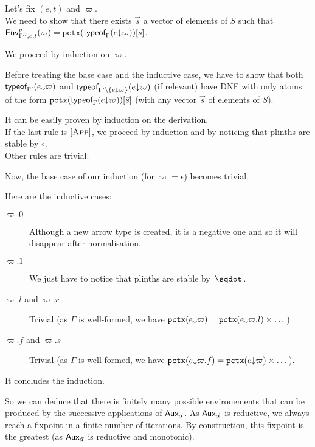 \documentclass[a4paper]{article}
\theoremstyle{definition}
\begin{document}
    Let's fix $(e,t)$ and $\varpi$.\\
    We need to show that there exists $\vec s$ a vector of elements of $S$ such that $\textsf{Env}^{p}_{\Gamma'',e,t} (\varpi) = \texttt{pctx}(\textsf{typeof}_{\Gamma}(e{\downarrow}\varpi))[\vec s]$.
    
    We proceed by induction on $\varpi$.

    Before treating the base case and the inductive case, we have to show that both $\textsf{typeof}_{\Gamma'}(e{\downarrow}\varpi)$
    and $\textsf{typeof}_{\Gamma'\setminus\{e{\downarrow}\varpi\}}(e{\downarrow}\varpi)$ (if relevant) have DNF with only atoms of the form
    $\texttt{pctx}(\textsf{typeof}_{\Gamma}(e{\downarrow}\varpi))[\vec s]$ (with any vector $\vec s$ of elements of $S$).

    It can be easily proven by induction on the derivation.\\
    If the last rule is $[\textsc{App}]$, we proceed by induction and by noticing that plinths are stable by $\circ$.\\
    Other rules are trivial.

    Now, the base case of our induction (for $\varpi=\epsilon$) becomes trivial.

    Here are the inductive cases:
    \begin{description}
      \item[$\varpi.0$] Although a new arrow type is created, it is a negative one and so it will disappear after normalisation.
      \item[$\varpi.1$] We just have to notice that plinths are stable by $\worra {} {}$.
      \item[$\varpi.l$ and $\varpi.r$] Trivial (as $\Gamma$ is well-formed, we have $\texttt{pctx}(e{\downarrow}\varpi) = \texttt{pctx}(e{\downarrow}\varpi.l)\times \dots$).
      \item[$\varpi.f$ and $\varpi.s$] Trivial (as $\Gamma$ is well-formed, we have $\texttt{pctx}(e{\downarrow}\varpi.f) = \texttt{pctx}(e{\downarrow}\varpi)\times \dots$).
    \end{description}

    It concludes the induction.

    So we can deduce that there is finitely many possible environements that can be produced by the successive applications of $\textsf{Aux}_{\vec \alpha}$.
    As $\textsf{Aux}_{\vec \alpha}$ is reductive, we always reach a fixpoint in a finite number of iterations.
    By construction, this fixpoint is the greatest (as $\textsf{Aux}_{\vec \alpha}$ is reductive and monotonic).
\end{document}
